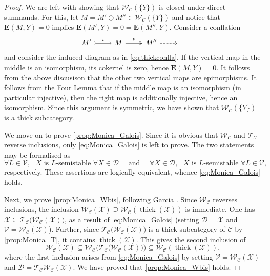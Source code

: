 \documentclass[10pt,twoside, a4paper,reqno]{amsart}
\DeclareMathOperator{\thick}{thick}
\newcommand{\calC}{\mathcal{C}}
\newcommand{\calD}{\mathcal{D}}
\newcommand{\calT}{\mathcal{T}}
\newcommand{\calW}{\mathcal{W}}
\newcommand{\E}{\mathbf{E}}
\theoremstyle{definition}
\begin{document}
\begin{proof}
    We are left with showing that $\calW_{\calC}(\{Y\})$ is closed under direct summands. For this, let $M = M' \oplus M'' \in \calW_{\calC}(\{Y\})$ and notice that $\E(M,Y) = 0$ implies $\E(M',Y) = 0=\E(M'', Y)$. Consider a conflation
    \begin{equation*}
        \begin{tikzcd}
            M' \arrow[r,tail,"i"] & M \arrow[r,two heads,"p"] & M'' \arrow[r, dashed] & \phantom{x}
        \end{tikzcd}
    \end{equation*}
    and consider the induced diagram as in \eqref{eq:thickconfla}. If the vertical map in the middle is an isomorphism, its cokernel is zero, hence $\E(M,Y) = 0$. It follows from the above discusison that the other two vertical maps are epimorphisms. It follows from the Four Lemma that if the middle map is an isomorphism (in particular injective), then the right map is additionally injective, hence an isomorphism. Since this argument is symmetric, we have shown that $\calW_{\calC}(\{Y\})$ is a thick subcategory.
    
    We move on to prove \eqref{prop:Monica_Galois}. Since it is obvious that $\calW_{\calC}$ and $\calT_{\calC}$ reverse inclusions, only \eqref{eq:Monica_Galois} is left to prove. 
    {The two statements may be formalised as 
    \[ \forall L \in \mathcal{V}, \text{ $X$ is $L$-semistable } \forall X \in \mathcal{D} \quad \text{ and } \quad  \forall X \in \mathcal{D}, \text{ $X$ is $L$-semistable } \forall L \in \mathcal{V},\]}
    respectively. These assertions are logically equivalent, whence \eqref{eq:Monica_Galois} holds.

    Next, we prove \eqref{prop:Monica_Wbis}, following Garcia \cite[{Prop.} 3.14(4)]{Gar23}. Since $\calW_{\calC}$ reverses inclusions, the inclusion $\calW_{\calC}(\mathcal{X})\supseteq \calW_{\calC}(\thick(\mathcal{X}))$ is immediate. One has  $\mathcal{X}\subseteq\calT_{\calC}{(}\calW_{\calC}(\mathcal{X}) {)}$, as a result of \eqref{eq:Monica_Galois} (setting {$\calD = \mathcal{X}$ and} $\mathcal{V}=\calW_{\calC}(\mathcal{X})$). Further, since $\calT_{\calC}{(}\calW_{\calC}(\mathcal{X}){)}$ is a thick subcategory of $\calC$ {by \eqref{prop:Monica_T}}, it contains $\thick(\mathcal{X})$. This gives the second inclusion of
    \begin{equation*}
        \calW_{\calC}(\mathcal{X}) \subseteq \calW_{\calC}{(}\calT_{\calC}{(}\calW_{\calC}(\mathcal{X}){))} \subseteq \calW_{\calC}(\thick(\mathcal{X})),
    \end{equation*}
    where the first inclusion arises from \eqref{eq:Monica_Galois} {by setting $\mathcal{V} = \calW_{\calC}(\mathcal{X})$ and $\calD = \calT_{\calC} \calW_{\calC}(\mathcal{X})$}.
    We have proved that \eqref{prop:Monica_Wbis} holds.


\end{proof}
\end{document}
